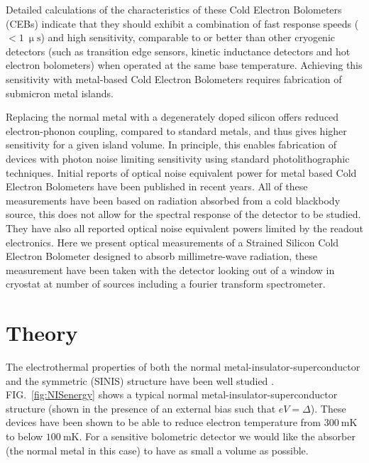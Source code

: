 \documentclass[aip, apl, a4paper, amsmath,amssymb, reprint]{revtex4-1}
\begin{document}
Detailed calculations of the characteristics of these Cold Electron Bolometers (CEBs) indicate that they should exhibit a combination of fast response speeds ($<1~\mathrm{\upmu s}$) and high sensitivity, comparable to or better than other cryogenic detectors (such as transition edge sensors, kinetic inductance detectors and hot electron bolometers) when operated at the same base temperature\cite{Kuzmin98, Golubev01, Kuzmin04, Kuzmin06}. Achieving this sensitivity with metal-based Cold Electron Bolometers requires fabrication of submicron metal islands. 

Replacing the normal metal with a degenerately doped silicon offers reduced electron-phonon coupling, compared to standard metals, and thus gives higher sensitivity for a given island volume\cite{Leoni99}. In principle, this enables fabrication of devices with photon noise limiting sensitivity using standard photolithographic techniques. Initial reports of optical noise equivalent power for metal based Cold Electron Bolometers have been published in recent years\cite{Otto2013, Tarasov2011}. All of these measurements have been based on radiation absorbed from a cold blackbody source, this does not allow for the spectral response of the detector to be studied. They have also all reported optical noise equivalent powers limited by the readout electronics. Here we present optical measurements of a Strained Silicon Cold Electron Bolometer designed to absorb millimetre-wave radiation, these measurement have been taken with the detector looking out of a window in cryostat at number of sources including a fourier transform spectrometer.

\section{Theory} \label{sec:Theory} 
The electrothermal properties of both the normal metal-insulator-superconductor and the symmetric (SINIS) structure have been well studied \cite{Pekola05, Nahum93, Nahum94, Leivo96, Savin01, Pekola04}. FIG.~\ref{fig:NISenergy} shows a typical normal metal-insulator-superconductor structure (shown in the presence of an external bias such that $eV = \Delta$). These devices have been shown\cite{Pekola04} to be able to reduce electron temperature from $300~\mathrm{mK}$ to below $100~\mathrm{mK}$. For a sensitive bolometric detector we would like the absorber (the normal metal in this case) to have as small a volume as possible.
\end{document}
